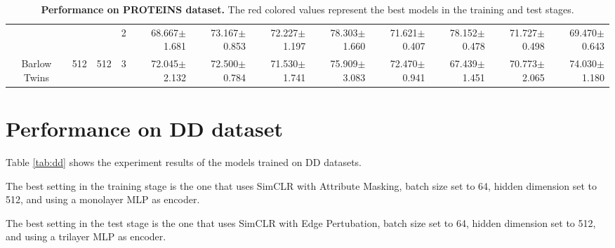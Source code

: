 \begin{table}[htpb]
{\begin{tabular}{c|c|c|c|rr|rr|rr|rr}
                                 &                                                                                 &                                                                                        & 2                                                                                         & 68.667$\pm$1.681                        & 73.167$\pm$0.853                        & 72.227$\pm$1.197                        & 78.303$\pm$1.660                        & 71.621$\pm$0.407                        & 78.152$\pm$0.478                        & 71.727$\pm$0.498                        & 69.470$\pm$0.643                       \\
\multirow{-12}{*}{Barlow Twins}  & \multirow{-6}{*}{512}                                                           & \multirow{-3}{*}{512}                                                                  & 3                                                                                         & 72.045$\pm$2.132                        & 72.500$\pm$0.784                        & 71.530$\pm$1.741                        & 75.909$\pm$3.083                        & 72.470$\pm$0.941                        & 67.439$\pm$1.451                        & 70.773$\pm$2.065                        & 74.030$\pm$1.180                       \\ \hline
\end{tabular}
}
    \caption[Performance on PROTEINS dataset]{\textbf{Performance on PROTEINS dataset.} The red colored values represent the best models in the training and test stages.}
    \label{tab:protein}
\end{table}

\section{Performance on DD dataset}


Table \ref{tab:dd} shows the experiment results of the models trained on DD datasets. 

The best setting in the training stage is the one that uses SimCLR with Attribute Masking, batch size set to 64, hidden dimension set to 512, and using a monolayer MLP as encoder.

The best setting in the test stage is the one that uses SimCLR with Edge Pertubation, batch size set to 64, hidden dimension set to 512, and using a trilayer MLP as encoder.

